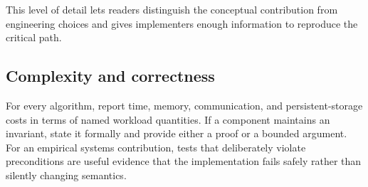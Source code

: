 This level of detail lets readers distinguish the conceptual contribution from
engineering choices and gives implementers enough information to reproduce the
critical path.

\subsection{Complexity and correctness}

For every algorithm, report time, memory, communication, and persistent-storage
costs in terms of named workload quantities.  If a component maintains an
invariant, state it formally and provide either a proof or a bounded argument.
For an empirical systems contribution, tests that deliberately violate
preconditions are useful evidence that the implementation fails safely rather
than silently changing semantics.
